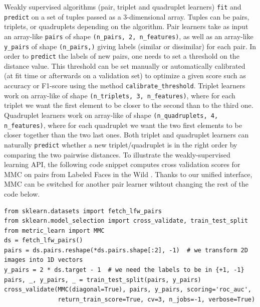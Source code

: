 \documentclass[twoside,11pt]{article}
\newcommand{\william}[1]{\todo[inline,caption={},color=blue!40]{{\it William:~}#1}}
\begin{document}
Weakly supervised algorithms (pair, triplet and quadruplet learners) \texttt{fit} and \texttt{predict} on a set of tuples passed as a 3-dimensional array. Tuples can be pairs, triplets, or quadruplets depending on the algorithm.
Pair learners take as input an array-like \texttt{pairs} of shape \texttt{(n\_pairs, 2, n\_features)}, as well as an array-like \texttt{y\_pairs} of shape \texttt{(n\_pairs,)} giving labels (similar or dissimilar) for each pair.
In order to \texttt{predict} the labels of new pairs, one needs to set a threshold on the distance value.
This threshold can be set manually or automatically calibrated (at fit time or afterwards on a validation set) to optimize a given score such as accuracy or F1-score using the method \texttt{calibrate\_threshold}.
Triplet learners work on array-like of shape \texttt{(n\_triplets, 3, n\_features)}, where for each triplet we want the first element to be closer to the second than to the third one.
Quadruplet learners work on array-like of shape \texttt{(n\_quadruplets, 4, n\_features)}, where for each quadruplet we want the two first elements to be closer together than the two last ones. Both triplet and quadruplet learners can naturally \texttt{predict} whether a new triplet/quadruplet is in the right order by comparing the two pairwise distances.
To illustrate the weakly-supervised learning API, the following code snippet computes cross validation scores for MMC on pairs from Labeled Faces in the Wild \citep{Huang12}. Thanks to our unified interface, MMC can be switched for another pair learner wihtout changing the rest of the code below.
\begin{verbatim}
from sklearn.datasets import fetch_lfw_pairs 
from sklearn.model_selection import cross_validate, train_test_split 
from metric_learn import MMC
ds = fetch_lfw_pairs()
pairs = ds.pairs.reshape(*ds.pairs.shape[:2], -1)  # we transform 2D images into 1D vectors
y_pairs = 2 * ds.target - 1  # we need the labels to be in {+1, -1}
pairs, _, y_pairs, _ = train_test_split(pairs, y_pairs)
cross_validate(MMC(diagonal=True), pairs, y_pairs, scoring='roc_auc', 
               return_train_score=True, cv=3, n_jobs=-1, verbose=True) 
\end{verbatim}
\end{document}
